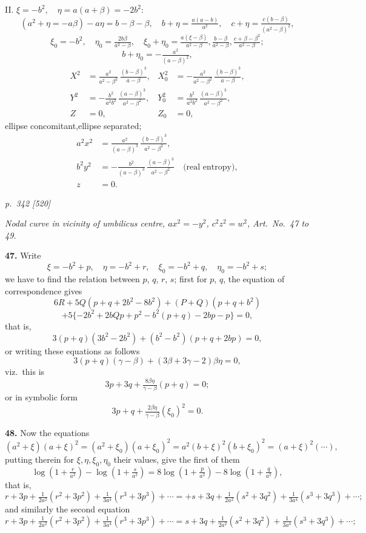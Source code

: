 \documentclass[11pt,a4paper]{book}
\begin{document}
II. $\xi = -b^2, \quad \eta = a(a + \beta) = -2b^2$:
\[
(a^2 + \eta = -a\beta) - a\eta = b - \beta - \beta,\quad b + \eta = \tfrac{a(a - b)}{a^2}, \quad c + \eta = \tfrac{c(b - \beta)}{(a^2 - \beta)^2},
\]
\[
\xi_0 = -b^2,\quad \eta_0 = \tfrac{2b\beta}{a^2 - \beta}, \quad \xi_0 + \eta_0 = \tfrac{a(\xi - \beta)}{a^2 - \beta}, \tfrac{b - \beta}{a^2 - \beta}, \tfrac{c + \beta - \beta^2}{a^2 - \beta};
\]
\[
b + \eta_0 = -\tfrac{a^2}{(a - \beta)^2},
\]
\begin{align*}
X^2 &= \tfrac{a^2}{a^2 - \beta^2}\,\tfrac{(b - \beta)^3}{a - \beta}, &
X_0^2 &= -\tfrac{a^2}{a^2 - \beta^2}\,\tfrac{(b - \beta)^3}{a - \beta},\\
Y^2 &= -\tfrac{b^2}{a^2 b^2}\,\tfrac{(a - \beta)^3}{a^2 - \beta^2}, &
Y_0^2 &= \tfrac{b^2}{a^2 b^2}\,\tfrac{(a - \beta)^3}{a^2 - \beta^2},\\
Z &= 0, & Z_0 &= 0,
\end{align*}
ellipse concomitant,\hfill ellipse separated;
\begin{align*}
a^2 x^2 &= \tfrac{a^2}{(a - \beta)^3}\,\tfrac{(b - \beta)^3}{a^2 - \beta^2},\\
b^2 y^2 &= -\tfrac{b^2}{(a - \beta)^3}\,\tfrac{(a - \beta)^3}{a^2 - \beta^2}\quad\text{(real entropy)},\\
z &= 0.
\end{align*}

\clearpage

\bigskip
\textit{p.~342 [520]}
\smallskip


\textit{Nodal curve in vicinity of umbilicus centre, $a x^2 = -y^2$, $c^2 z^2 = w^2$, Art.\ No.\ 47 to 49.}

\textbf{47.} Write
\[
\xi = -b^2 + p,\quad \eta = -b^2 + r,\quad \xi_0 = -b^2 + q, \quad \eta_0 = -b^2 + s;
\]
we have to find the relation between $p$, $q$, $r$, $s$; first for $p$, $q$, the equation of correspondence gives
\[
6R + 5Q(p + q + 2b^2 - 8b^2) + (P + Q)(p + q + b^2)
\]
\[
+ 5\{-2b^2 + 2bQp + p^2 - b^2(p + q) - 2bp - p\} = 0,
\]
that is,
\[
3(p + q)(3b^2 - 2b^2) + (b^2 - b^2)(p + q + 2bp) = 0,
\]
or writing these equations as follows
\[
3(p + q)(\gamma - \beta) + (3 \beta + 3\gamma - 2)\beta\eta = 0,
\]
viz.\ this is
\[
3p + 3q + \tfrac{8\beta\eta}{\gamma - \beta}(p + q) = 0;
\]
or in symbolic form
\[
3p + q + \tfrac{2\beta\eta}{\gamma - \beta}(\xi_0)^2 = 0.
\]

\textbf{48.} Now the equations
\[
(a^2 + \xi)(a + \xi)^2 = (a^2 + \xi_0)(a + \xi_0)^2 = a^2(b + \xi)^2(b + \xi_0)^2 = (a + \xi)^2(\cdots),
\]
putting therein for $\xi, \eta, \xi_0, \eta_0$ their values, give the first of them
\[
\log\!\left(1 + \tfrac{r}{a^2}\right) - \log\!\left(1 + \tfrac{s}{a^2}\right) = 8\log\!\left(1 + \tfrac{p}{a^2}\right) - 8\log\!\left(1 + \tfrac{q}{a^2}\right),
\]
that is,
\[
r + 3p + \tfrac{1}{2a^2}(r^2 + 3p^2) + \tfrac{1}{3a^4}(r^3 + 3p^3) + \cdots = +s + 3q + \tfrac{1}{2a^2}(s^2 + 3q^2) + \tfrac{1}{3a^4}(s^3 + 3q^3) + \cdots ;
\]
and similarly the second equation
\[
r + 3p + \tfrac{1}{2a^2}(r^2 + 3p^2) + \tfrac{1}{3a^4}(r^3 + 3p^3) + \cdots = s + 3q + \tfrac{1}{2a^2}(s^2 + 3q^2) + \tfrac{1}{3a^4}(s^3 + 3q^3) + \cdots;
\]
\end{document}
